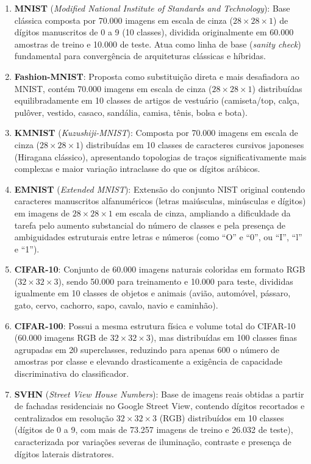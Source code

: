\documentclass[
    12pt,
    openright,
    oneside,
    a4paper,
    english,
    brazil
]{abntex2}
\begin{document}
\begin{enumerate}
    \item \textbf{MNIST} (\textit{Modified National Institute of Standards and Technology}): Base clássica composta por 70.000 imagens em escala de cinza (\(28 \times 28 \times 1\)) de dígitos manuscritos de 0 a 9 (10 classes), dividida originalmente em 60.000 amostras de treino e 10.000 de teste. Atua como linha de base (\textit{sanity check}) fundamental para convergência de arquiteturas clássicas e híbridas.
    \item \textbf{Fashion-MNIST}: Proposta como substituição direta e mais desafiadora ao MNIST, contém 70.000 imagens em escala de cinza (\(28 \times 28 \times 1\)) distribuídas equilibradamente em 10 classes de artigos de vestuário (camiseta/top, calça, pulôver, vestido, casaco, sandália, camisa, tênis, bolsa e bota).
    \item \textbf{KMNIST} (\textit{Kuzushiji-MNIST}): Composta por 70.000 imagens em escala de cinza (\(28 \times 28 \times 1\)) distribuídas em 10 classes de caracteres cursivos japoneses (Hiragana clássico), apresentando topologias de traços significativamente mais complexas e maior variação intraclasse do que os dígitos arábicos.
    \item \textbf{EMNIST} (\textit{Extended MNIST}): Extensão do conjunto NIST original contendo caracteres manuscritos alfanuméricos (letras maiúsculas, minúsculas e dígitos) em imagens de \(28 \times 28 \times 1\) em escala de cinza, ampliando a dificuldade da tarefa pelo aumento substancial do número de classes e pela presença de ambiguidades estruturais entre letras e números (como ``O'' e ``0'', ou ``I'', ``l'' e ``1'').
    \item \textbf{CIFAR-10}: Conjunto de 60.000 imagens naturais coloridas em formato RGB (\(32 \times 32 \times 3\)), sendo 50.000 para treinamento e 10.000 para teste, divididas igualmente em 10 classes de objetos e animais (avião, automóvel, pássaro, gato, cervo, cachorro, sapo, cavalo, navio e caminhão).
    \item \textbf{CIFAR-100}: Possui a mesma estrutura física e volume total do CIFAR-10 (60.000 imagens RGB de \(32 \times 32 \times 3\)), mas distribuídas em 100 classes finas agrupadas em 20 superclasses, reduzindo para apenas 600 o número de amostras por classe e elevando drasticamente a exigência de capacidade discriminativa do classificador.
    \item \textbf{SVHN} (\textit{Street View House Numbers}): Base de imagens reais obtidas a partir de fachadas residenciais no Google Street View, contendo dígitos recortados e centralizados em resolução \(32 \times 32 \times 3\) (RGB) distribuídos em 10 classes (dígitos de 0 a 9, com mais de 73.257 imagens de treino e 26.032 de teste), caracterizada por variações severas de iluminação, contraste e presença de dígitos laterais distratores.

\end{enumerate}
\end{document}
